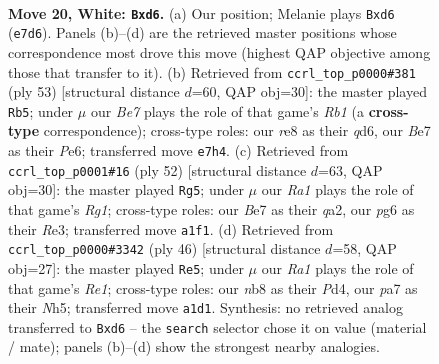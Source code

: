 \documentclass[11pt]{article}
\begin{document}
\clearpage

\begin{figure}[p]\centering
\begin{subfigure}{0.46\textwidth}\centering
\resizebox{\linewidth}{!}{%
\newchessgame
\chessboard[
  setfen={rn2r1k1/p3Bp1p/3p2p1/8/2Q1P1q1/8/P4P1P/R6K w - - 0 20},
  showmover=false,
  pgfstyle=straightmove, color=movearrow, markmove={e7-d6}
]}
\caption{}
\end{subfigure}\hfill
\begin{subfigure}{0.46\textwidth}\centering
\resizebox{\linewidth}{!}{%
\newchessgame
\chessboard[
  setfen={1r4k1/5p2/3Qp2p/p4p2/2q5/2P1P2P/P4PP1/2R3K1 b - - 3 27},
  showmover=false,
  pgfstyle=straightmove, color=movearrow, markmove={b8-b5}
]}
\caption{}
\end{subfigure}
\\[4pt]
\begin{subfigure}{0.46\textwidth}\centering
\resizebox{\linewidth}{!}{%
\newchessgame
\chessboard[
  setfen={1k1r3r/1p3p2/p2p4/8/3Q3P/4R3/qPP2P2/2K3R1 w - - 4 27},
  showmover=false,
  pgfstyle=straightmove, color=movearrow, markmove={g1-g5}
]}
\caption{}
\end{subfigure}\hfill
\begin{subfigure}{0.46\textwidth}\centering
\resizebox{\linewidth}{!}{%
\newchessgame
\chessboard[
  setfen={5nk1/pp3r2/2q4p/3p2pN/3P4/1QP5/P5PP/4R1K1 w - - 2 24},
  showmover=false,
  pgfstyle=straightmove, color=movearrow, markmove={e1-e5}
]}
\caption{}
\end{subfigure}
\caption{\textbf{Move 20, White: \texttt{Bxd6}.} (a) Our position; Melanie plays \texttt{Bxd6} (\texttt{e7d6}). Panels (b)--(d) are the retrieved master positions whose correspondence most drove this move (highest QAP objective among those that transfer to it). (b) Retrieved from \texttt{ccrl\_top\_p0000\#381} (ply 53) [structural distance $d$=60, QAP obj=30]: the master played \texttt{Rb5}; under $\mu$ our \emph{Be7} plays the role of that game's \emph{Rb1} (a \textbf{cross-type} correspondence); cross-type roles: our \emph{r}e8 as their \emph{q}d6, our \emph{B}e7 as their \emph{P}e6; transferred move \texttt{e7h4}. (c) Retrieved from \texttt{ccrl\_top\_p0001\#16} (ply 52) [structural distance $d$=63, QAP obj=30]: the master played \texttt{Rg5}; under $\mu$ our \emph{Ra1} plays the role of that game's \emph{Rg1}; cross-type roles: our \emph{B}e7 as their \emph{q}a2, our \emph{p}g6 as their \emph{R}e3; transferred move \texttt{a1f1}. (d) Retrieved from \texttt{ccrl\_top\_p0000\#3342} (ply 46) [structural distance $d$=58, QAP obj=27]: the master played \texttt{Re5}; under $\mu$ our \emph{Ra1} plays the role of that game's \emph{Re1}; cross-type roles: our \emph{n}b8 as their \emph{P}d4, our \emph{p}a7 as their \emph{N}h5; transferred move \texttt{a1d1}. Synthesis: no retrieved analog transferred to \texttt{Bxd6} -- the \texttt{search} selector chose it on value (material / mate); panels (b)--(d) show the strongest nearby analogies.}
\label{fig:thought-m38}
\end{figure}
\end{document}
